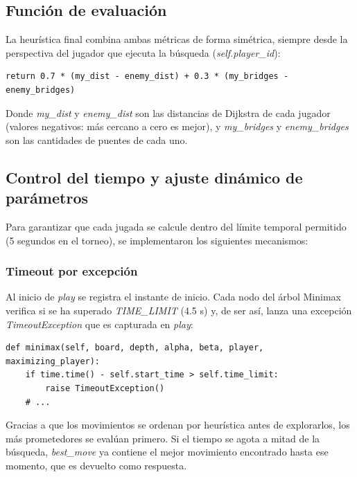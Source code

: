 \documentclass[spanish]{article}
\begin{document}
\subsection{Funci\'on de evaluaci\'on}

La heur\'istica final combina ambas m\'etricas de forma sim\'etrica, siempre desde la perspectiva del jugador que ejecuta la b\'usqueda (\textit{self.player\_id}):

\begin{lstlisting}
return 0.7 * (my_dist - enemy_dist) + 0.3 * (my_bridges - enemy_bridges)
\end{lstlisting}

Donde \textit{my\_dist} y \textit{enemy\_dist} son las distancias de Dijkstra de cada jugador (valores negativos: m\'as cercano a cero es mejor), y \textit{my\_bridges} y \textit{enemy\_bridges} son las cantidades de puentes de cada uno.

\subsection{Control del tiempo y ajuste din\'amico de par\'ametros}

Para garantizar que cada jugada se calcule dentro del l\'imite temporal permitido (5 segundos en el torneo), se implementaron los siguientes mecanismos:

\subsubsection*{Timeout por excepci\'on}

Al inicio de \textit{play} se registra el instante de inicio. Cada nodo del \'arbol Minimax verifica si se ha superado \textit{TIME\_LIMIT} (4.5 s) y, de ser as\'i, lanza una excepci\'on \textit{TimeoutException} que es capturada en \textit{play}:

\begin{lstlisting}
def minimax(self, board, depth, alpha, beta, player, maximizing_player):
    if time.time() - self.start_time > self.time_limit:
        raise TimeoutException()
    # ...
\end{lstlisting}

Gracias a que los movimientos se ordenan por heur\'istica antes de explorarlos, los m\'as prometedores se eval\'uan primero. Si el tiempo se agota a mitad de la b\'usqueda, \textit{best\_move} ya contiene el mejor movimiento encontrado hasta ese momento, que es devuelto como respuesta.
\end{document}
